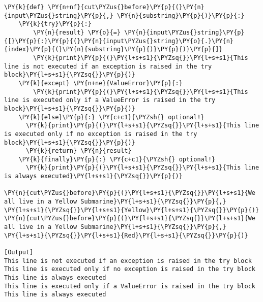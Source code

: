 \begin{Verbatim}[label=\makebox{\url{https://github.com/lucabaldini/cmepda/tree/master/slides/latex/snippets/exceptions.py}},commandchars=\\\{\}]
\PY{k}{def} \PY{n+nf}{cut\PYZus{}before}\PY{p}{(}\PY{n}{input\PYZus{}string}\PY{p}{,} \PY{n}{substring}\PY{p}{)}\PY{p}{:}
    \PY{k}{try}\PY{p}{:}
        \PY{n}{result} \PY{o}{=} \PY{n}{input\PYZus{}string}\PY{p}{[}\PY{p}{:}\PY{p}{(}\PY{n}{input\PYZus{}string}\PY{o}{.}\PY{n}{index}\PY{p}{(}\PY{n}{substring}\PY{p}{)}\PY{p}{)}\PY{p}{]}
        \PY{k}{print}\PY{p}{(}\PY{l+s+s1}{\PYZsq{}}\PY{l+s+s1}{This line is not executed if an exception is raised in the try block}\PY{l+s+s1}{\PYZsq{}}\PY{p}{)}
    \PY{k}{except} \PY{n+ne}{ValueError}\PY{p}{:}
        \PY{k}{print}\PY{p}{(}\PY{l+s+s1}{\PYZsq{}}\PY{l+s+s1}{This line is executed only if a ValueError is raised in the try block}\PY{l+s+s1}{\PYZsq{}}\PY{p}{)}
    \PY{k}{else}\PY{p}{:} \PY{c+c1}{\PYZsh{} optional!}
      \PY{k}{print}\PY{p}{(}\PY{l+s+s1}{\PYZsq{}}\PY{l+s+s1}{This line is executed only if no exception is raised in the try block}\PY{l+s+s1}{\PYZsq{}}\PY{p}{)}
      \PY{k}{return} \PY{n}{result}
    \PY{k}{finally}\PY{p}{:} \PY{c+c1}{\PYZsh{} optional!}
      \PY{k}{print}\PY{p}{(}\PY{l+s+s1}{\PYZsq{}}\PY{l+s+s1}{This line is always executed}\PY{l+s+s1}{\PYZsq{}}\PY{p}{)}

\PY{n}{cut\PYZus{}before}\PY{p}{(}\PY{l+s+s1}{\PYZsq{}}\PY{l+s+s1}{We all live in a Yellow Submarine}\PY{l+s+s1}{\PYZsq{}}\PY{p}{,} \PY{l+s+s1}{\PYZsq{}}\PY{l+s+s1}{Yellow}\PY{l+s+s1}{\PYZsq{}}\PY{p}{)}
\PY{n}{cut\PYZus{}before}\PY{p}{(}\PY{l+s+s1}{\PYZsq{}}\PY{l+s+s1}{We all live in a Yellow Submarine}\PY{l+s+s1}{\PYZsq{}}\PY{p}{,} \PY{l+s+s1}{\PYZsq{}}\PY{l+s+s1}{Red}\PY{l+s+s1}{\PYZsq{}}\PY{p}{)}

[Output]
This line is not executed if an exception is raised in the try block
This line is executed only if no exception is raised in the try block
This line is always executed
This line is executed only if a ValueError is raised in the try block
This line is always executed
\end{Verbatim}